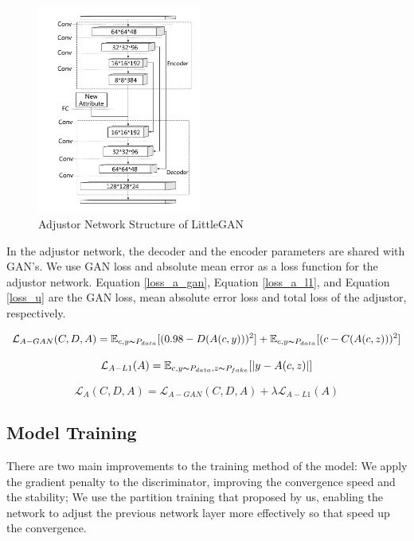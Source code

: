 \begin{figure}
    \begin{center}
    \includegraphics[width=0.48\textwidth]{figures/net_adjustor.pdf}
    \caption{Adjustor Network Structure of LittleGAN}
    \label{net_adjustor}
    \end{center}
\end{figure}

In the adjustor network, the decoder and the encoder parameters are shared with GAN's.
We use GAN loss and absolute mean error as a loss function for the adjustor network.
Equation \eqref{loss_a_gan}, Equation \eqref{loss_a_l1}, and Equation \eqref{loss_u} are the GAN loss,
    mean absolute error loss and total loss of the adjustor, respectively.

\begin{equation}
    \mathcal{L}_{A-GAN}(C,D,A)=
    \mathbb{E}_{c,y\thicksim P_{data}}[(0.98-D(A(c,y)))^2]+
    \mathbb{E}_{c,y\thicksim P_{data}}[(c-C(A(c,z)))^2]
    \label{loss_a_gan}
\end{equation}

\begin{equation}
    \mathcal{L}_{A-L1}(A)=
    \mathbb{E}_{c,y\thicksim P_{data},z\thicksim P_{fake}}[|y-A(c,z)|]
    \label{loss_a_l1}
\end{equation}

\begin{equation}
    \mathcal{L}_{A}(C,D,A)=
    \mathcal{L}_{A-GAN}(C,D,A)+
    \lambda \mathcal{L}_{A-L1}(A)
    \label{loss_u}
\end{equation}

\subsection{Model Training}
There are two main improvements to the training method of the model:
    We apply the gradient penalty to the discriminator, improving the convergence speed and the stability;
    We use the partition training that proposed by us,
    enabling the network to adjust the previous network layer more effectively
    so that speed up the convergence.

